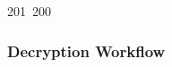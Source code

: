 201~200~\documentclass{article}
\begin{document}
	                                                                                                                                                                                                                                                                                                	                                                                                                                                        	    	                                                                                                	                                                                                                                                                                                                                                                                                                                                	                                                                        	                                                                        	                                                                                                                                        	                                                                                                                                                                                                                        	                                                                                                                            	                                                                	                                                                                                                                            \subsubsection{Decryption Workflow}
\end{document}
